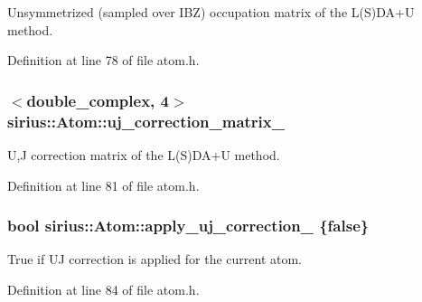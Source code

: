 Unsymmetrized (sampled over I\+B\+Z) occupation matrix of the L(\+S)D\+A+\+U method. 



Definition at line 78 of file atom.\+h.

\hypertarget{classsirius_1_1_atom_a726686bb7f7d0efe87980b93496a4315}{}
\subsubsection[{uj\+\_\+correction\+\_\+matrix\+\_\+}]{$<$double\+\_\+complex, 4$>$ sirius\+::\+Atom\+::uj\+\_\+correction\+\_\+matrix\+\_\+\hspace{0.3cm}{\ttfamily [private]}}\label{classsirius_1_1_atom_a726686bb7f7d0efe87980b93496a4315}


U,J correction matrix of the L(\+S)D\+A+\+U method. 



Definition at line 81 of file atom.\+h.

\hypertarget{classsirius_1_1_atom_a3abd3bfce30e865efd825d2411a45713}{}
\subsubsection[{apply\+\_\+uj\+\_\+correction\+\_\+}]{\setlength{\rightskip}{0pt plus 5cm}bool sirius\+::\+Atom\+::apply\+\_\+uj\+\_\+correction\+\_\+ \{false\}\hspace{0.3cm}{\ttfamily [private]}}\label{classsirius_1_1_atom_a3abd3bfce30e865efd825d2411a45713}


True if U\+J correction is applied for the current atom. 



Definition at line 84 of file atom.\+h.

\hypertarget{classsirius_1_1_atom_adcf069a095d4f0f9b1c5debe34e6ed94}{}
